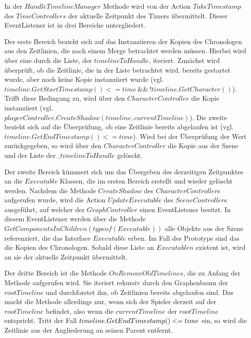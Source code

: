 In der $HandleTimelineManager$ Methode wird von der Action $TakeTimestamp$ des $TimeControllers$ der aktuelle Zeitpunkt des Timers übermittelt. Dieser EventListener ist in drei Bereiche untergliedert. 

Der erste Bereich bezieht sich auf das Instanziieren der Kopien des Chronologen aus den Zeitlinien, die nach einem Merge betrachtet werden müssen. Hierbei wird über eine  durch die Liste, der $timelineToHandle$, iteriert.
Zunächst wird überprüft, ob die Zeitlinie, die in der Liste betrachtet wird. bereits gestartet wurde, aber noch keine Kopie instanziiert wurde (vgl. $timeline.GetStartTimestamp() <= time ~\&\&~ !timeline.GetCharacter()$). Trifft diese Bedingung zu, wird über den $CharacterController$ die Kopie instanziiert (vgl.\\ $playerController.CreateShadow(timeline, currentTimeline)$). 
Die zweite  bezieht sich auf die Überprüfung, ob eine Zeitlinie bereits abgelaufen ist (vgl.\\$timeline.GetEndTimestamp() <= time$). Wird bei der Überprüfung der Wert  zurückgegeben, so wird über den $CharacterController$ die Kopie aus der Szene und der Liste der $\_timelineToHandle$ gelöscht.

Der zweite Bereich kümmert sich um das Übergeben des derzeitigen Zeitpunktes an die $Executable$ Klassen, die im ersten Bereich erstellt und wieder gelöscht werden. Nachdem die Methode $CreateShadow$ des $CharacterController$s aufgerufen wurde, wird die Action $UpdateExecutable$ des $SceneController$s ausgeführt, auf welcher der $GraphController$ einen EventListener besitzt. In diesem EventListener werden über die Methode $GetComponentsInChildren(typeof(Executable))$ alle Objekte aus der Szene referenziert, die das Interface $Executable$ erben. Im Fall des Prototyps sind das die Kopien des Chronologen. Sobald diese Liste an $Executablen$ existent ist, wird an sie der aktuelle Zeitpunkt übermittelt.

Der dritte Bereich ist die Methode $OnRemoveOldTimelines$, die zu Anfang der Methode aufgerufen wird. Sie iteriert rekursiv durch den Graphenbaum der $rootTimeline$ und durchforstet ihn, ob Zeitlinien bereits abgelaufen sind. Das macht die Methode allerdings nur, wenn sich der Spieler derzeit auf der $rootTimeline$ befindet, also wenn die $currentTimeline$ der $rootTimeline$ entspricht. Tritt der Fall $\\timeline.GetEndTimestamp() <= time$ ein, so wird die Zeitlinie aus der Angliederung an seinen Parent entfernt.

